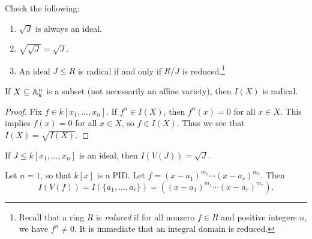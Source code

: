 \begin{exercise}
  Check the following:
  \begin{enumerate}
    \item $\sqrt{J}$ is always an ideal.
    \item $\sqrt{\sqrt{J}} = \sqrt{J}$.
    \item An ideal $J \le R$ is radical
      if and only if $R / J$ is
      reduced.\footnote{Recall that a ring $R$ is \emph{reduced} if for all nonzero $f \in R$ and positive integers $n$, we have $f^n \ne 0$. It is immediate that an integral domain is reduced.}
  \end{enumerate}
\end{exercise}

\begin{prop}
  If $X \subseteq \mathbb{A}^n_k$ is a subset
  (not necessarily an affine variety),
  then $I(X)$ is radical.
\end{prop}

\begin{proof}
  Fix $f \in k[x_1, \dots, x_n]$. If
  $f^n \in I(X)$, then $f^n(x) = 0$ for
  all $x \in X$. This implies
  $f(x) = 0$ for all $x \in X$, so
  $f \in I(X)$. Thus we see that
  $I(X) = \sqrt{I(X)}$.
\end{proof}

\begin{theorem}
  \label{thm:hilbert-nullstellensatz}
  If $J \le k[x_1, \dots, x_n]$ is an
  ideal, then $I(V(J)) = \sqrt{J}$.
\end{theorem}

\begin{example}
  Let $n = 1$, so that $k[x]$ is a PID. Let $f = (x - a_1)^{m_1} \cdots (x - a_r)^{m_r}$.
  Then
  \[
    I(V(f)) = I(\{a_1, \dots, a_r\})
    = ((x - a_1)^{m_1} \cdots (x - a_r)^{m_r}).
  \]
\end{example}
